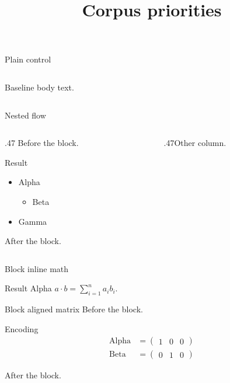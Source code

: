 \documentclass[aspectratio=169]{beamer}
\title{Corpus priorities}
\author{}
\date{}
\begin{document}
\begin{frame}{Plain control}
  \begin{columns}[T,totalwidth=\textwidth]
    \begin{column}{\textwidth}Baseline body text.\end{column}
  \end{columns}
\end{frame}

\begin{frame}{Nested flow}
  \begin{columns}[T,totalwidth=\textwidth]
    \begin{column}{.47\textwidth}
      Before the block.
      \begin{block}{Result}
        \begin{itemize}
          \item Alpha
          \begin{itemize}\item Beta\end{itemize}
          \item Gamma
        \end{itemize}
      \end{block}
      After the block.
    \end{column}
    \begin{column}{.47\textwidth}Other column.\end{column}
  \end{columns}
\end{frame}

\begin{frame}{Block inline math}
  \begin{exampleblock}{Result}
    Alpha $a\cdot b=\sum_{i=1}^{n}a_i b_i$.
  \end{exampleblock}
\end{frame}

\begin{frame}{Block aligned matrix}
  Before the block.
  \begin{block}{Encoding}
    \begin{align*}
      \mathrm{Alpha}&=\begin{pmatrix}1&0&0\end{pmatrix}\\
      \mathrm{Beta}&=\begin{pmatrix}0&1&0\end{pmatrix}
    \end{align*}
  \end{block}
  After the block.
\end{frame}
\end{document}
